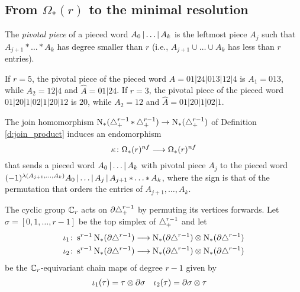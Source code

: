 
\subsection{From \texorpdfstring{$\Omega_*(r)$}{Omega(r)} to the minimal resolution}\label{ss:mapf}

The \emph{pivotal piece} of a pieced word $A_0\operatorname{|} \dots\operatorname{|} A_k$ is the leftmost piece $A_j$ such that $A_{j+1}*\dots*A_k$ has degree smaller than $r$ (i.e., $A_{j+1}\cup\dots\cup A_k$ has less than $r$ entries).

\begin{example}
	If $r=5$, the pivotal piece of the pieced word $A=01|24|013|12|4$ is $A_1 = 013$, while $A_2 = 12|4$ and $\hat{A} = 01|24$. If $r=3$, the pivotal piece of the pieced word $01|20|1|02|1|20|12$ is $20$, while $A_2 = 12$ and $\hat{A} = 01|20|1|02|1$.
\end{example}

The join homomorphism $\operatorname{N}_{*}(\triangle_{+}^{r-1}\operatorname{\ast} \triangle_{+}^{r-1}) \to \operatorname{N}_{*}(\triangle_{+}^{r-1})$ of Definition \ref{d:join_product} induces an endomorphism
\[
\kappa \colon \Omega_*(r)^{nf} \longrightarrow \Omega_*(r)^{nf}
\]
that sends a pieced word $A_0\operatorname{|} \dots\operatorname{|} A_k$ with pivotal piece $A_j$ to the pieced word $(-1)^{\lambda(A_{j+1},\dots,A_k)}A_0\operatorname{|} \dots\operatorname{|} A_j\operatorname{|} A_{j+1}\operatorname{\ast}\dots\operatorname{\ast} A_k$, where the sign is that of the permutation that orders the entries of $A_{j+1},\dots,A_k$.

The cyclic group $\mathbb{C}_r$ acts on $\partial \triangle_{+}^{r-1}$ by permuting its vertices forwards. Let $\sigma = [0,1,\dots,r-1]$ be the top simplex of $\triangle_{+}^{r-1}$ and let
\begin{align*}
	\iota_1 \colon \operatorname{s}^{r-1}\operatorname{N}_{*}(\partial \triangle^{r-1})& \longrightarrow \operatorname{N}_{*}(\partial\triangle^{r-1}) \otimes \operatorname{N}_{*}(\partial\triangle^{r-1})\\
	\iota_2 \colon \operatorname{s}^{r-1}\operatorname{N}_{*}(\partial \triangle^{r-1})& \longrightarrow \operatorname{N}_{*}(\partial\triangle^{r-1}) \otimes \operatorname{N}_{*}(\partial\triangle^{r-1})
\end{align*}
be the $\mathbb{C}_r$-equivariant chain maps of degree $r-1$ given by
\begin{align*}
	\iota_1(\tau) &= \tau \otimes \partial \sigma &
	\iota_2(\tau) &= \partial \sigma \otimes \tau
\end{align*}

